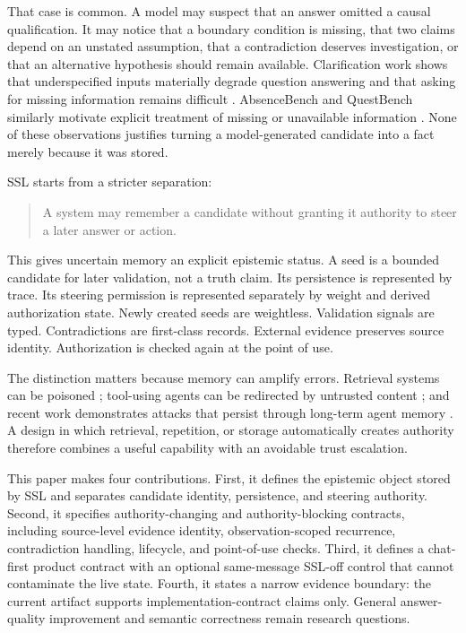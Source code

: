 \documentclass[11pt]{article}
\begin{document}
That case is common. A model may suspect that an answer omitted a causal qualification. It may notice that a boundary condition is missing, that two claims depend on an unstated assumption, that a contradiction deserves investigation, or that an alternative hypothesis should remain available. Clarification work shows that underspecified inputs materially degrade question answering and that asking for missing information remains difficult \citep{huang2026underspecified,zhao2026askbench,suri2026structured,toles2025clarification}. AbsenceBench and QuestBench similarly motivate explicit treatment of missing or unavailable information \citep{fu2025absencebench,li2025questbench}. None of these observations justifies turning a model-generated candidate into a fact merely because it was stored.

SSL starts from a stricter separation:
\begin{quote}
A system may remember a candidate without granting it authority to steer a later answer or action.
\end{quote}
This gives uncertain memory an explicit epistemic status. A seed is a bounded candidate for later validation, not a truth claim. Its persistence is represented by trace. Its steering permission is represented separately by weight and derived authorization state. Newly created seeds are weightless. Validation signals are typed. Contradictions are first-class records. External evidence preserves source identity. Authorization is checked again at the point of use.

The distinction matters because memory can amplify errors. Retrieval systems can be poisoned \citep{zou2025poisonedrag}; tool-using agents can be redirected by untrusted content \citep{debenedetti2024agentdojo}; and recent work demonstrates attacks that persist through long-term agent memory \citep{qian2026visual}. A design in which retrieval, repetition, or storage automatically creates authority therefore combines a useful capability with an avoidable trust escalation.

This paper makes four contributions. First, it defines the epistemic object stored by SSL and separates candidate identity, persistence, and steering authority. Second, it specifies authority-changing and authority-blocking contracts, including source-level evidence identity, observation-scoped recurrence, contradiction handling, lifecycle, and point-of-use checks. Third, it defines a chat-first product contract with an optional same-message SSL-off control that cannot contaminate the live state. Fourth, it states a narrow evidence boundary: the current artifact supports implementation-contract claims only. General answer-quality improvement and semantic correctness remain research questions.
\end{document}
